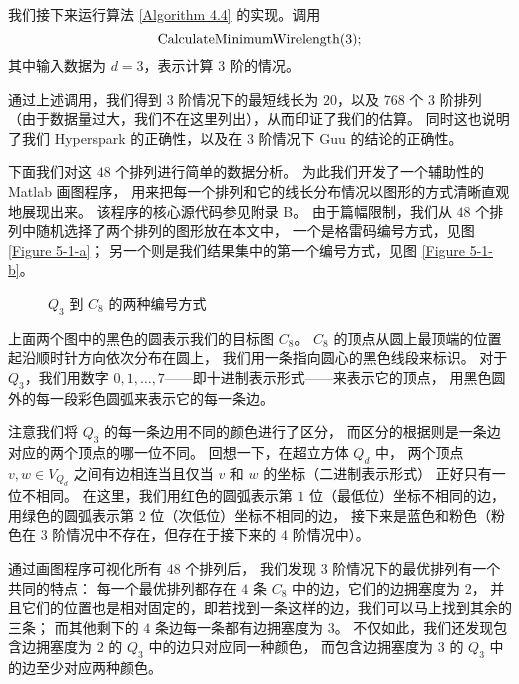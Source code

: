 我们接下来运行算法 \ref{Algorithm 4.4} 的实现。调用
\begin{equation*}
\textnormal{CalculateMinimumWirelength}(3);
\end{equation*}
其中输入数据为 $d = 3$，表示计算 $3$ 阶的情况。

通过上述调用，我们得到 $3$ 阶情况下的最短线长为 $20$，以及 $768$ 个 $3$ 阶排列
（由于数据量过大，我们不在这里列出），从而印证了我们的估算。
同时这也说明了我们 Hyperspark 的正确性，以及在 $3$ 阶情况下 Guu 的结论的正确性。

下面我们对这 $48$ 个排列进行简单的数据分析。
为此我们开发了一个辅助性的 Matlab 画图程序，
用来把每一个排列和它的线长分布情况以图形的方式清晰直观地展现出来。
该程序的核心源代码参见附录 B。
由于篇幅限制，我们从 $48$ 个排列中随机选择了两个排列的图形放在本文中，
一个是格雷码编号方式，见图 \ref{Figure 5-1-a}；
另一个则是我们结果集中的第一个编号方式，见图 \ref{Figure 5-1-b}。

\begin{figure}[h!]
	\centering
	\subfloat[格雷码编号方式]{
		
		\label{Figure 5-1-a}
	}
	\subfloat[另一种最优编号方式]{
		
		\label{Figure 5-1-b}
	}
	\caption{$Q_3$ 到 $C_{8}$ 的两种编号方式}
	\label{Figure 5-1}
\end{figure}

上面两个图中的黑色的圆表示我们的目标图 $C_8$。
$C_8$ 的顶点从圆上最顶端的位置起沿顺时针方向依次分布在圆上，
我们用一条指向圆心的黑色线段来标识。
对于 $Q_3$，我们用数字 $0, 1, \dots, 7$——即十进制表示形式——来表示它的顶点，
用黑色圆外的每一段彩色圆弧来表示它的每一条边。

注意我们将 $Q_3$ 的每一条边用不同的颜色进行了区分，
而区分的根据则是一条边对应的两个顶点的哪一位不同。
回想一下，在超立方体 $Q_d$ 中，
两个顶点 $v, w \in V_{Q_d}$ 之间有边相连当且仅当 $v$ 和 $w$ 的坐标（二进制表示形式）
正好只有一位不相同。
在这里，我们用红色的圆弧表示第 $1$ 位（最低位）坐标不相同的边，
用绿色的圆弧表示第 $2$ 位（次低位）坐标不相同的边，
接下来是蓝色和粉色（粉色在 $3$ 阶情况中不存在，但存在于接下来的 $4$ 阶情况中）。

通过画图程序可视化所有 $48$ 个排列后，
我们发现 $3$ 阶情况下的最优排列有一个共同的特点：
每一个最优排列都存在 $4$ 条 $C_8$ 中的边，它们的边拥塞度为 $2$，
并且它们的位置也是相对固定的，即若找到一条这样的边，我们可以马上找到其余的三条；
而其他剩下的 $4$ 条边每一条都有边拥塞度为 $3$。
不仅如此，我们还发现包含边拥塞度为 $2$ 的 $Q_3$ 中的边只对应同一种颜色，
而包含边拥塞度为 $3$ 的 $Q_3$ 中的边至少对应两种颜色。

